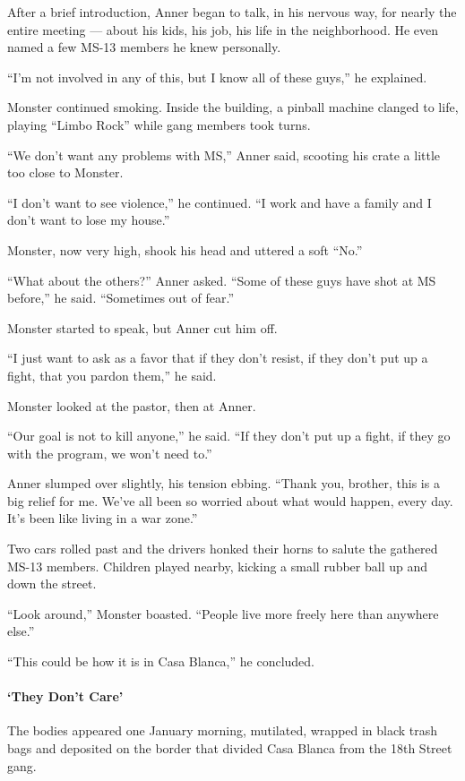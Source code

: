 After a brief introduction, Anner began to talk, in his nervous way, for
nearly the entire meeting --- about his kids, his job, his life in the
neighborhood. He even named a few MS-13 members he knew personally.

``I'm not involved in any of this, but I know all of these guys,'' he
explained.

Monster continued smoking. Inside the building, a pinball machine
clanged to life, playing ``Limbo Rock'' while gang members took turns.

``We don't want any problems with MS,'' Anner said, scooting his crate a
little too close to Monster.

``I don't want to see violence,'' he continued. ``I work and have a
family and I don't want to lose my house.''

Monster, now very high, shook his head and uttered a soft ``No.''

``What about the others?'' Anner asked. ``Some of these guys have shot
at MS before,'' he said. ``Sometimes out of fear.''

Monster started to speak, but Anner cut him off.

``I just want to ask as a favor that if they don't resist, if they don't
put up a fight, that you pardon them,'' he said.

Monster looked at the pastor, then at Anner.

``Our goal is not to kill anyone,'' he said. ``If they don't put up a
fight, if they go with the program, we won't need to.''

Anner slumped over slightly, his tension ebbing. ``Thank you, brother,
this is a big relief for me. We've all been so worried about what would
happen, every day. It's been like living in a war zone.''

Two cars rolled past and the drivers honked their horns to salute the
gathered MS-13 members. Children played nearby, kicking a small rubber
ball up and down the street.

``Look around,'' Monster boasted. ``People live more freely here than
anywhere else.''

``This could be how it is in Casa Blanca,'' he concluded.

\hypertarget{they-dont-care}{%
\paragraph{`They Don't Care'}\label{they-dont-care}}

The bodies appeared one January morning, mutilated, wrapped in black
trash bags and deposited on the border that divided Casa Blanca from the
18th Street gang.

